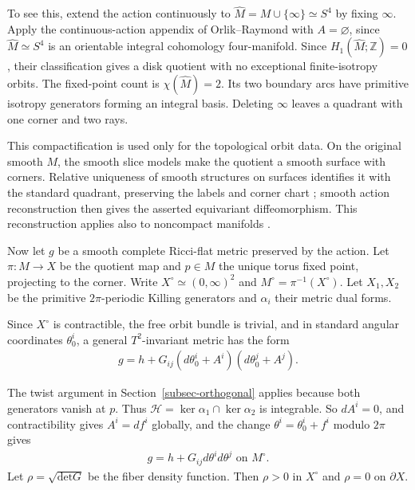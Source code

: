 \documentclass[letterpaper]{amsart}
\theoremstyle{definition}
\theoremstyle{remark}
\begin{document}
To see this, extend the action continuously to $\hat M=M\cup\{\infty\}\simeq S^4$ by fixing $\infty$. Apply the continuous-action appendix of Orlik--Raymond with $A=\varnothing$, since $\hat M\simeq S^4$ is an orientable integral cohomology four-manifold. Since $H_1(\hat M;\mathbb Z)=0$, their classification gives a disk quotient with no exceptional finite-isotropy orbits. The fixed-point count is $\chi(\hat M)=2$. Its two boundary arcs have primitive isotropy generators forming an integral basis. Deleting $\infty$ leaves a quadrant with one corner and two rays.

This compactification is used only for the topological orbit data. On the original smooth $M$, the smooth slice models make the quotient a smooth surface with corners. Relative uniqueness of smooth structures on surfaces identifies it with the standard quadrant, preserving the labels and corner chart \cite[Theorem~B and relative-boundary version]{notes-Hatcher}; smooth action reconstruction then gives the asserted equivariant diffeomorphism. This reconstruction applies also to noncompact manifolds \cite[\S\S1.11--1.12, p.~537, and Appendix]{notes-OrlikRaymond}. 

Now let $g$ be a smooth complete Ricci-flat metric preserved by the action. Let $\pi:M\to X$ be the quotient map and $p\in M$ the unique torus fixed point, projecting to the corner. Write $X^\circ\simeq(0,\infty)^2$ and $M^\circ=\pi^{-1}(X^\circ)$. Let $X_1,X_2$ be the primitive $2\pi$-periodic Killing generators and $\alpha_i$ their metric dual forms.

Since $X ^{\circ}$ is contractible, the free orbit bundle is trivial, and in standard angular coordinates $\theta _0 ^{i}$, a general $T^2$-invariant metric has the form
\begin{align*}
	g = h + G_{ij} (d \theta ^{i}_{0} + A ^{i})(d \theta _0 ^{j} + A ^{j}).
\end{align*} 

The twist argument in Section~\ref{subsec-orthogonal} applies because both generators vanish at $p$. Thus $\mathcal{H}=\ker\alpha_1\cap\ker\alpha_2$ is integrable. So $d A ^{i} =0$, and contractibility gives $A ^{i} = d f ^{i}$ globally, and the change $\theta ^{i} = \theta _0 ^{i} + f ^{i}$ modulo $2 \pi $ gives
\begin{align*}
	g = h + G_{ij} d \theta ^{i} d \theta ^{j} \text{ on } M ^{\circ}.
\end{align*} 
Let $\rho = \sqrt{\mathrm{det}G} $ be the fiber density function. Then $\rho >0$ in $X ^{\circ}$ and $\rho =0$ on $\partial X$. 
\end{document}
